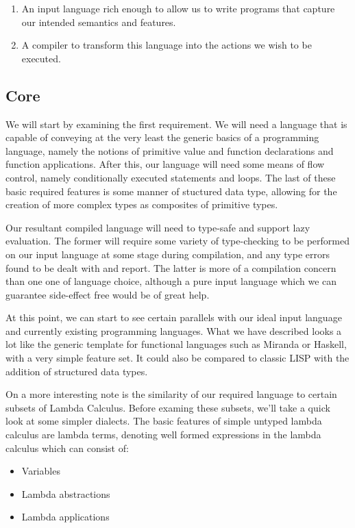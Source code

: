 \documentclass[11pt]{article}
\begin{document}
\begin{enumerate}
	\item An input language rich enough to allow us to write programs
		  that capture our intended semantics and features.
	\item A compiler to transform this language into the actions we 
	 	  wish to be executed.
\end{enumerate}

\subsection{Core}

\noindent We will start by examining the first requirement. We will need a
language that is capable of conveying at the very least the generic basics of a programming language, namely the notions of primitive value and function
declarations and function applications. After this, our language will need
some means of flow control, namely conditionally executed statements and 
loops. The last of these basic required features is some manner of stuctured
data type, allowing for the creation of more complex types as composites of
primitive types. 

Our resultant compiled language will need to type-safe and support lazy
evaluation. The former will require some variety of type-checking to be 
performed on our input language at some stage during compilation, and any
type errors found to be dealt with and report. The latter is more of a 
compilation concern than one one of language choice, although a pure input
language which we can guarantee side-effect free would be of great help.

At this point, we can start to see certain parallels with our ideal input
language and currently existing programming languages. What we have described
looks a lot like the generic template for functional languages such as Miranda
or Haskell, with a very simple feature set. It could also be compared to 
classic LISP with the addition of structured data types. 

On a more interesting note is the similarity of our required language to
certain subsets of Lambda Calculus. Before examing these subsets, we'll
take a quick look at some simpler dialects. The basic
features of simple untyped lambda calculus are lambda terms, denoting well formed expressions in the lambda calculus which can consist of:

\begin{itemize}
\item Variables
\item Lambda abstractions
\item Lambda applications
\end{itemize}
\end{document}
